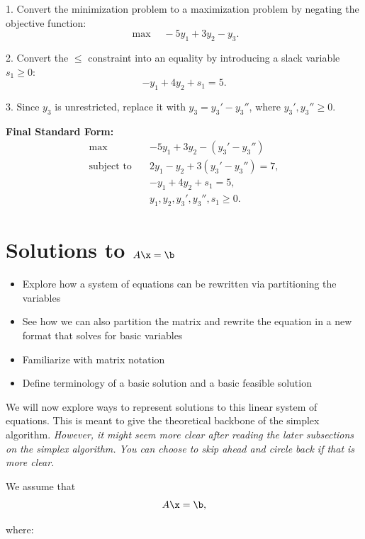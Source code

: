 \begin{solution}

1. Convert the minimization problem to a maximization problem by negating the objective function:
   \[
   \max \quad -5y_1 + 3y_2 - y_3.
   \]

2. Convert the \( \leq \) constraint into an equality by introducing a slack variable \( s_1 \geq 0 \):
   \[
   -y_1 + 4y_2 + s_1 = 5.
   \]

3. Since \( y_3 \) is unrestricted, replace it with \( y_3 = y_3' - y_3'' \), where \( y_3', y_3'' \geq 0 \).

\textbf{Final Standard Form:}
\[
\begin{aligned}
    \max \quad & -5y_1 + 3y_2 - (y_3' - y_3'') \\
    \text{subject to} \quad 
    & 2y_1 - y_2 + 3(y_3' - y_3'') = 7, \\
    & -y_1 + 4y_2 + s_1 = 5, \\
    & y_1, y_2, y_3', y_3'', s_1 \geq 0.
\end{aligned}
\]
\end{solution}



\section{Solutions to $A\x = \b$}
\begin{outcome}
\begin{itemize}
\item Explore how a system of equations can be rewritten via partitioning the variables
\item See how we can also partition the matrix and rewrite the equation in a new format that solves for basic variables
\item Familiarize with matrix notation
\item Define terminology of a basic solution and a basic feasible solution
\end{itemize}
\end{outcome}
We will now explore ways to represent solutions to this linear system of equations.  This is meant to give the theoretical backbone of the simplex algorithm.  \emph{However, it might seem more clear after reading the later subsections on the simplex algorithm. You can choose to skip ahead and circle back if that is more clear.}



We assume that 
\[
A \x = \b,
\]

where:

